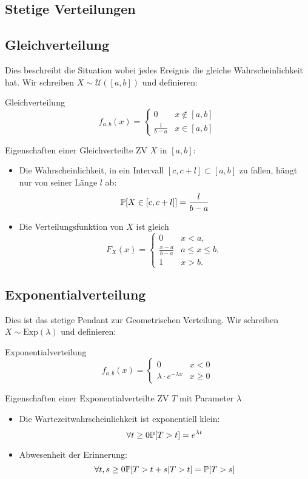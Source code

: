 \subsection{Stetige Verteilungen}

\subsection*{Gleichverteilung} 
Dies beschreibt die Situation wobei jedes Ereignis die gleiche Wahrscheinlichkeit hat. Wir schreiben $X \sim \mathcal{U}([a,b])$ und definieren:
\begin{mainbox}{Gleichverteilung}
$$f_{a,b}(x) = \begin{cases}
    0 & x \notin [a,b] \\
    \frac{1}{b-a} & x \in [a,b]
\end{cases}$$
\end{mainbox}
\begin{subbox}{Eigenschaften einer Gleichverteilte ZV $X$ in $[a, b]$:}
    \begin{itemize}
        \item Die Wahrscheinlichkeit, in ein Intervall $[c, c + l] \subset [a, b]$ zu fallen, hängt nur von seiner Länge $l$ ab:
        $$\mathbb{P}[X \in [c, c+l]] = \frac{l}{b-a}$$
        \item Die Verteilungsfunktion von $X$ ist gleich
        $$F_X(x) = \begin{cases}
            0 & x < a, \\
            \frac{x-a}{b-a} & a \leq x \leq b, \\
            1 & x > b.
        \end{cases}$$
    \end{itemize}
\end{subbox}

\subsection*{Exponentialverteilung} Dies ist das stetige Pendant zur Geometrischen Verteilung. Wir schreiben $X \sim \text{Exp}(\lambda)$ und definieren:
\begin{mainbox}{Exponentialverteilung}
    $$f_{a,b}(x) = \begin{cases}
        0 &x < 0 \\
       \lambda \cdot e^{-\lambda x} & x \geq 0
    \end{cases}$$
\end{mainbox}

\begin{subbox}{Eigenschaften einer Exponentialverteilte ZV $T$ mit Parameter $\lambda$}
    \begin{itemize}
        \item Die Wartezeitwahrscheinlichkeit ist exponentiell klein:
        $$\forall t \geq 0 \mathbb{P}[T > t] = e^{\lambda t}$$
        \item Abwesenheit der Erinnerung:
        $$\forall t, s\geq 0 \mathbb{P}[T > t + s|T > t] = \mathbb{P}[T > s]$$
    \end{itemize}
\end{subbox}


